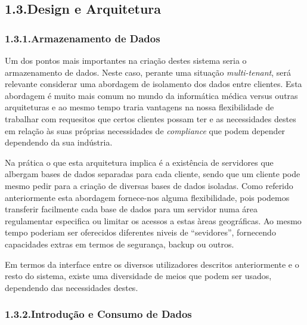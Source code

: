\documentclass{article}
\begin{document}
\subsection{1.3.\hspace*{0.5em}Design e Arquitetura}\label{sec-design-e-arquitetura}%

\subsubsection{1.3.1.\hspace*{0.5em}Armazenamento de Dados}\label{sec-armazenamento-de-dados}%

\noindent{}Um dos pontos mais importantes na criação destes sistema seria o armazenamento de dados. Neste caso, perante uma situação \emph{multi-tenant}, será relevante considerar uma abordagem de isolamento dos dados entre clientes. Esta abordagem é muito mais comum no mundo da informática médica versus outras arquiteturas e ao mesmo tempo traria vantagens na nossa flexibilidade de trabalhar com requesitos que certos clientes possam ter e as necessidades destes em relação às suas próprias necessidades de \emph{compliance} que podem depender dependendo da sua indústria.%

Na prática o que esta arquitetura implica é a existência de servidores que albergam bases de dados separadas para cada cliente, sendo que um cliente pode mesmo pedir para a criação de diversas bases de dados isoladas. Como referido anteriormente esta abordagem fornece-nos alguma flexibilidade, pois podemos transferir facilmente cada base de dados para um servidor numa área regulamentar especifica ou limitar os acessos a estas àreas geográficas. Ao mesmo tempo poderiam ser oferecidos diferentes niveis de \textquotedblleft{}sevidores\textquotedblright{}, fornecendo capacidades extras em termos de segurança, backup ou outros.%

Em termos da interface entre os diversos utilizadores descritos anteriormente e o resto do sistema, existe uma diversidade de meios que podem ser usados, dependendo das necessidades destes.%

\subsubsection{1.3.2.\hspace*{0.5em}Introdução e Consumo de Dados}\label{sec-introduo-e-consumo-de-dados}%
\end{document}
